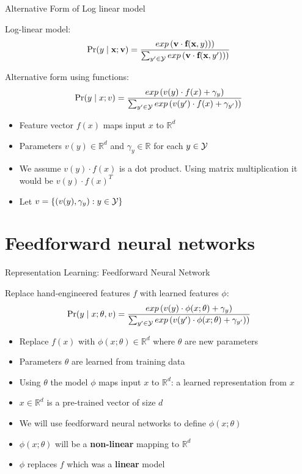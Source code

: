 \begin{frame}{Alternative Form of Log linear model}
\begin{block}{Log-linear model:}
\[ \Pr(y \mid \textbf{x}; \textbf{v}) = \frac{exp\left(\textbf{v} \cdot \textbf{f}(\textbf{x}, y))\right)}{\sum_{y' \in {\cal Y}} exp\left(\textbf{v} \cdot \textbf{f}(\textbf{x}, y'))\right)} \]
\end{block}

\begin{block}{Alternative form using functions:}
\[ \Pr(y \mid x; v) = \frac{exp\left(v(y) \cdot f(x) + \gamma_y \right)}{\sum_{y' \in {\cal Y}} exp\left(v(y') \cdot f(x) + \gamma_{y'})\right)} \]
\end{block}

\begin{itemize}[<+->]
\item Feature vector $f(x)$ maps input $x$ to $\mathbb{R}^d$
\item Parameters $v(y) \in \mathbb{R}^d$ and $\gamma_y \in \mathbb{R}$ for each $y \in {\cal Y}$
\item We assume $v(y) \cdot f(x)$ is a dot product. Using matrix multiplication it would be $v(y) \cdot f(x)^T$
\item Let $v = \{ (v(y), \gamma_y) : y \in {\cal Y} \} $
\end{itemize}
\end{frame}

\section{Feedforward neural networks}
\frame{\tableofcontents[currentsection]}

\begin{frame}{Representation Learning: Feedforward Neural Network}
\begin{block}{Replace hand-engineered features $f$ with learned features $\phi$:}
\[ \Pr(y \mid x; \theta, v) = \frac{exp\left(v(y) \cdot \phi(x;\theta) + \gamma_y \right)}{\sum_{y' \in {\cal Y}} exp\left(v(y') \cdot \phi(x;\theta) + \gamma_{y'})\right)} \]
\end{block}

\begin{itemize}[<+->]
\item Replace $f(x)$ with $\phi(x;\theta) \in \mathbb{R}^d$ where $\theta$ are new parameters
\item Parameters $\theta$ are learned from training data
\item Using $\theta$ the model $\phi$ maps input $x$ to $\mathbb{R}^d$: a learned representation from $x$
\item $x \in \mathbb{R}^d$ is a pre-trained vector of size $d$
\item We will use feedforward neural networks to define $\phi(x;\theta)$
\item $\phi(x;\theta)$ will be a \textbf{non-linear} mapping to $\mathbb{R}^d$ 
\item $\phi$ replaces $f$ which was a \textbf{linear} model
\end{itemize}
\end{frame}

